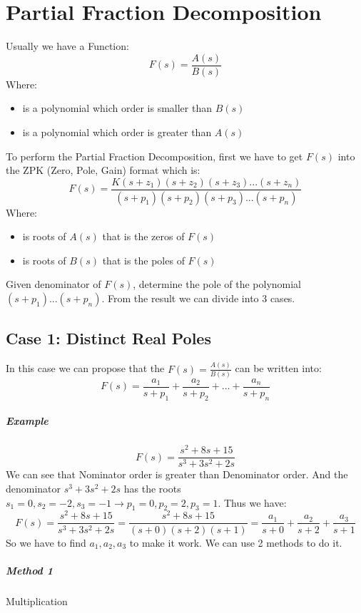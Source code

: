 \chapter{Partial Fraction Decomposition}
Usually we have a Function:
\[
F(s) = \frac{A(s)}{B(s)}
\]
Where:
\begin{itemize}
	\item { is a polynomial which order is smaller than \(B(s)\)}
	\item { is a polynomial which order is greater than \(A(s)\)}
\end{itemize}
To perform the Partial Fraction Decomposition, first we have to get \(F(s)\) into the ZPK (Zero, Pole, Gain) format which is:
\[
F(s) = \frac{K (s+z_1)(s+z_2)(s+z_3)...(s+z_n)}{(s+p_1)(s+p_2)(s+p_3)...(s+p_n)}
\]
Where:
\begin{itemize}
	\item { is roots of \(A(s)\) that is the zeros of \(F(s)\)}
	\item { is roots of \(B(s)\) that is the poles of \(F(s)\)}
\end{itemize}
Given denominator of \(F(s)\), determine the pole of the polynomial \((s+p_1)...(s+p_n)\). From the result we can divide into 3 cases.
\section{Case 1: Distinct Real Poles}
\begin{tcolorbox}[title=Method]
	In this case we can propose that the \(F(s) = \frac{A(s)}{B(s)}\) can be written into:
	\[
	F(s) = \frac{a_1}{s+p_1} + \frac{a_2}{s+p_2} + ... + \frac{a_n}{s+p_n}
	\]
\end{tcolorbox}

\paragraph{Example}
\[
F(s) = \frac{s^2+8s+15}{s^3+3s^2+2s}
\]
We can see that Nominator order is greater than Denominator order. And the denominator \(s^3+3s^2+2s\) has the roots \(s_1=0 , s_2=-2 , s_3=-1 \rightarrow p_1=0, p_2=2, p_3=1\). Thus we have:
\[
F(s) = \frac{s^2+8s+15}{s^3+3s^2+2s} = \frac{s^2+8s+15}{(s+0)(s+2)(s+1)} = \frac{a_1}{s+0} + \frac{a_2}{s+2} + \frac{a_3}{s+1} 
\]
So we have to find \(a_1,a_2,a_3\) to make it work. We can use 2 methods to do it.

\paragraph{Method 1} Multiplication

